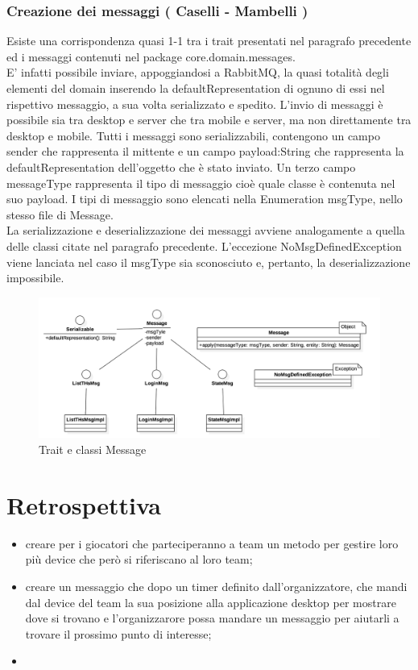 \documentclass[12pt, italian]{article}
\begin{document}
\subsubsection{Creazione dei messaggi ( Caselli - Mambelli )}
Esiste una corrispondenza quasi 1-1 tra i trait presentati nel paragrafo precedente ed i messaggi contenuti nel package core.domain.messages.\\
E' infatti possibile inviare, appoggiandosi a RabbitMQ, la quasi totalità degli elementi del domain inserendo la defaultRepresentation di ognuno di essi nel rispettivo messaggio, a sua volta serializzato e spedito.
L'invio di messaggi è possibile sia tra desktop e server che tra mobile e server, ma non direttamente tra desktop e mobile.
Tutti i messaggi sono serializzabili, contengono un campo sender che rappresenta il mittente e un campo payload:String che rappresenta la defaultRepresentation dell'oggetto che è stato inviato.
Un terzo campo messageType rappresenta il tipo di messaggio cioè quale classe è contenuta nel suo payload.
I tipi di messaggio sono elencati nella Enumeration msgType, nello stesso file di Message.\\
La serializzazione e deserializzazione dei messaggi avviene analogamente a quella delle classi citate nel paragrafo precedente.
L'eccezione NoMsgDefinedException viene lanciata nel caso il msgType sia sconosciuto e, pertanto, la deserializzazione impossibile.

\begin{figure}[H]
	\centering
	\includegraphics[width=1\textwidth]{img/diagram02.png}
	\caption{Trait e classi Message}
\end{figure}

\newpage
\section{Retrospettiva}
\begin{itemize}
	\item creare per i giocatori che parteciperanno a team un metodo per gestire loro più device che però si riferiscano al loro team;
	\item creare un messaggio che dopo un timer definito dall'organizzatore, che mandi dal device del team la sua posizione alla applicazione desktop per mostrare dove si trovano e l'organizzarore possa mandare un messaggio per aiutarli a trovare il prossimo punto di interesse;
	\item 
\end{itemize}
\vspace{-30pt}
\end{document}
